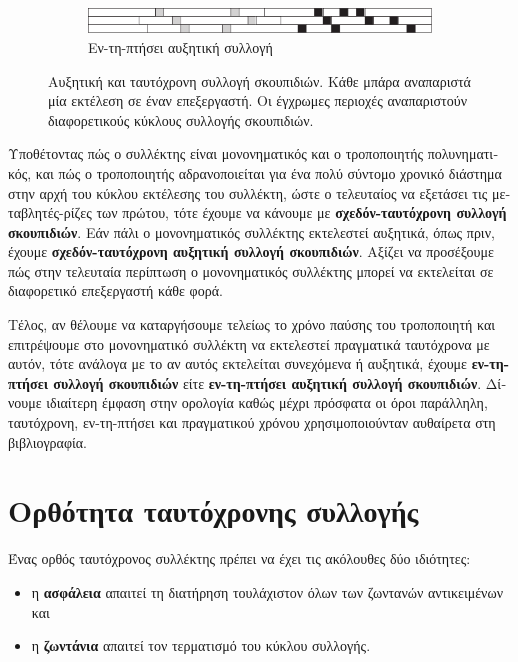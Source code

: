 \begin{greek}
\begin{figure}[H]
  \begin{subfigure}[b]{1.0\textwidth}
    \includegraphics{figures/conc_1g}
    \caption{Εν-τη-πτήσει αυξητική συλλογή}
  \end{subfigure}
    
   \caption[Αυξητική και ταυτόχρονη συλλογή σκουπιδιών]
     {Αυξητική και ταυτόχρονη συλλογή σκουπιδιών. Κάθε μπάρα αναπαριστά μία εκτέλεση σε έναν επεξεργαστή.
      Οι έγχρωμες περιοχές αναπαριστούν διαφορετικούς κύκλους
      συλλογής σκουπιδιών.}
\end{figure}

Υποθέτοντας πώς ο συλλέκτης είναι μονονηματικός και ο
τροποποιητής πολυνηματικός, και πώς ο τροποποιητής
αδρανοποιείται για ένα πολύ σύντομο χρονικό διάστημα στην
αρχή του κύκλου εκτέλεσης του συλλέκτη, ώστε ο τελευταίος να
εξετάσει τις μεταβλητές-ρίζες των πρώτου, τότε έχουμε να
κάνουμε με \textbf{σχεδόν-ταυτόχρονη συλλογή σκουπιδιών}. Εάν
πάλι ο μονονηματικός συλλέκτης εκτελεστεί αυξητικά, όπως πριν,
έχουμε \textbf{σχεδόν-ταυτόχρονη αυξητική συλλογή σκουπιδιών}.
Αξίζει να προσέξουμε πώς στην τελευταία περίπτωση ο
μονονηματικός συλλέκτης μπορεί να εκτελείται σε διαφορετικό 
επεξεργαστή κάθε φορά.

Τέλος, αν θέλουμε να καταργήσουμε τελείως το χρόνο παύσης του
τροποποιητή και επιτρέψουμε στο μονονηματικό συλλέκτη να
εκτελεστεί πραγματικά ταυτόχρονα με αυτόν, τότε ανάλογα με το
αν αυτός εκτελείται συνεχόμενα ή αυξητικά, έχουμε
\textbf{εν-τη-πτήσει συλλογή σκουπιδιών} είτε
\textbf{εν-τη-πτήσει αυξητική συλλογή σκουπιδιών}. Δίνουμε
ιδιαίτερη έμφαση στην ορολογία καθώς μέχρι πρόσφατα οι όροι
παράλληλη, ταυτόχρονη, εν-τη-πτήσει και πραγματικού χρόνου
χρησιμοποιούνταν αυθαίρετα στη βιβλιογραφία.

\section{Ορθότητα ταυτόχρονης συλλογής}
Ένας ορθός ταυτόχρονος συλλέκτης πρέπει να έχει τις ακόλουθες
δύο ιδιότητες:

\begin{itemize}
\item η \textbf{ασφάλεια} απαιτεί τη διατήρηση τουλάχιστον
      όλων των ζωντανών αντικειμένων και
\item η \textbf{ζωντάνια} απαιτεί τον τερματισμό του κύκλου
      συλλογής.
\end{itemize}


\end{greek}
